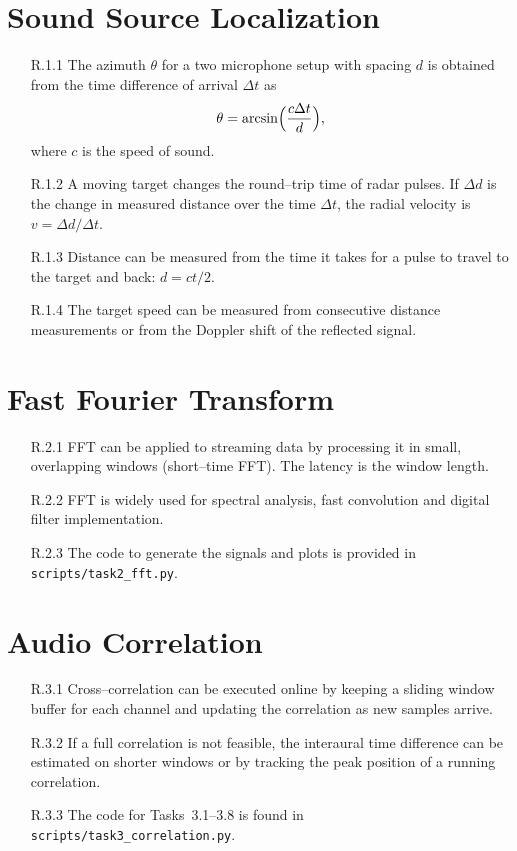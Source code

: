 \section{Sound Source Localization}
\begin{enumerate}
\item[R.1.1] The azimuth $\theta$ for a two microphone setup with spacing $d$ is obtained from the time difference of arrival $\Delta t$ as
\[\theta = \arcsin\Bigl(\frac{c \Delta t}{d}\Bigr),\]
where $c$ is the speed of sound.
\item[R.1.2] A moving target changes the round--trip time of radar pulses. If $\Delta d$ is the change in measured distance over the time $\Delta t$, the radial velocity is $v = \Delta d/\Delta t$.
\item[R.1.3] Distance can be measured from the time it takes for a pulse to travel to the target and back: $d=c t/2$.
\item[R.1.4] The target speed can be measured from consecutive distance measurements or from the Doppler shift of the reflected signal.
\end{enumerate}

\section{Fast Fourier Transform}
\begin{enumerate}
\item[R.2.1] FFT can be applied to streaming data by processing it in small, overlapping windows (short--time FFT). The latency is the window length.
\item[R.2.2] FFT is widely used for spectral analysis, fast convolution and digital filter implementation.
\item[R.2.3] The code to generate the signals and plots is provided in \texttt{scripts/task2\_fft.py}.
\end{enumerate}

\section{Audio Correlation}
\begin{enumerate}
\item[R.3.1] Cross--correlation can be executed online by keeping a sliding window buffer for each channel and updating the correlation as new samples arrive.
\item[R.3.2] If a full correlation is not feasible, the interaural time difference can be estimated on shorter windows or by tracking the peak position of a running correlation.
\item[R.3.3] The code for Tasks~3.1--3.8 is found in \texttt{scripts/task3\_correlation.py}.
\end{enumerate}

